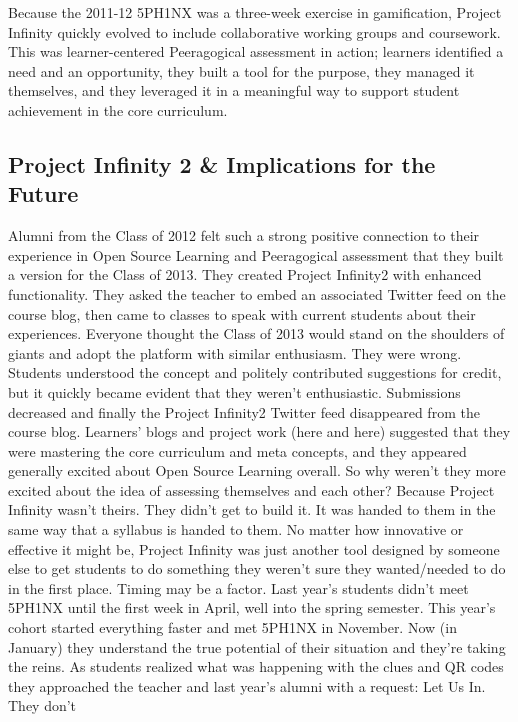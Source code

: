 Because the 2011-12 5PH1NX was a three-week exercise in gamification,
Project Infinity quickly evolved to include collaborative working
groups and coursework. This was learner-centered Peeragogical
assessment in action; learners identified a need and an opportunity,
they built a tool for the purpose, they managed it themselves, and
they leveraged it in a meaningful way to support student achievement
in the core curriculum.

\subsection{Project Infinity 2 \& Implications for the Future}

Alumni from the Class of 2012 felt such a strong positive connection to
their experience in Open Source Learning and Peeragogical assessment
that they built a version for the Class of 2013. They created Project
Infinity2 with enhanced functionality. They asked the teacher to embed
an associated Twitter feed on the course blog, then came to classes to
speak with current students about their experiences. Everyone thought
the Class of 2013 would stand on the shoulders of giants and adopt the
platform with similar enthusiasm. They were wrong. Students understood
the concept and politely contributed suggestions for credit, but it
quickly became evident that they weren't enthusiastic. Submissions
decreased and finally the Project Infinity2 Twitter feed disappeared
from the course blog. Learners' blogs and project work (here and here)
suggested that they were mastering the core curriculum and meta
concepts, and they appeared generally excited about Open Source Learning
overall. So why weren't they more excited about the idea of assessing
themselves and each other? Because Project Infinity wasn't theirs. They
didn't get to build it. It was handed to them in the same way that a
syllabus is handed to them. No matter how innovative or effective it
might be, Project Infinity was just another tool designed by someone
else to get students to do something they weren't sure they
wanted/needed to do in the first place. Timing may be a factor. Last
year's students didn't meet 5PH1NX until the first week in April, well
into the spring semester. This year's cohort started everything faster
and met 5PH1NX in November. Now (in January) they understand the true
potential of their situation and they're taking the reins. As students
realized what was happening with the clues and QR codes they approached
the teacher and last year's alumni with a request: Let Us In. They don't
